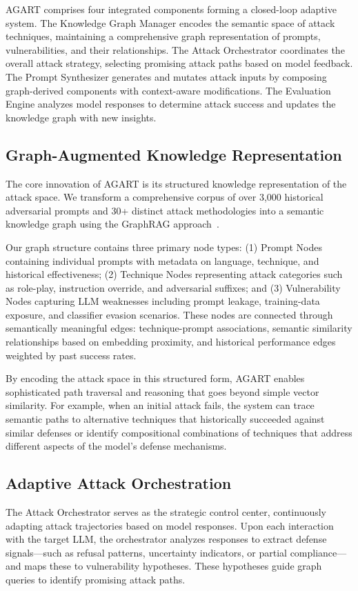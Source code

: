 AGART comprises four integrated components forming a closed-loop adaptive system. The Knowledge Graph Manager encodes the semantic space of attack techniques, maintaining a comprehensive graph representation of prompts, vulnerabilities, and their relationships. The Attack Orchestrator coordinates the overall attack strategy, selecting promising attack paths based on model feedback. The Prompt Synthesizer generates and mutates attack inputs by composing graph-derived components with context-aware modifications. The Evaluation Engine analyzes model responses to determine attack success and updates the knowledge graph with new insights.

\subsection{Graph-Augmented Knowledge Representation}
The core innovation of AGART is its structured knowledge representation of the attack space. We transform a comprehensive corpus of over 3,000 historical adversarial prompts and 30+ distinct attack methodologies into a semantic knowledge graph using the GraphRAG approach~\cite{GraphRAG}. 

Our graph structure contains three primary node types: (1) Prompt Nodes containing individual prompts with metadata on language, technique, and historical effectiveness; (2) Technique Nodes representing attack categories such as role-play, instruction override, and adversarial suffixes; and (3) Vulnerability Nodes capturing LLM weaknesses including prompt leakage, training-data exposure, and classifier evasion scenarios. These nodes are connected through semantically meaningful edges: technique-prompt associations, semantic similarity relationships based on embedding proximity, and historical performance edges weighted by past success rates.

By encoding the attack space in this structured form, AGART enables sophisticated path traversal and reasoning that goes beyond simple vector similarity. For example, when an initial attack fails, the system can trace semantic paths to alternative techniques that historically succeeded against similar defenses or identify compositional combinations of techniques that address different aspects of the model's defense mechanisms.

\subsection{Adaptive Attack Orchestration}
The Attack Orchestrator serves as the strategic control center, continuously adapting attack trajectories based on model responses. Upon each interaction with the target LLM, the orchestrator analyzes responses to extract defense signals—such as refusal patterns, uncertainty indicators, or partial compliance—and maps these to vulnerability hypotheses. These hypotheses guide graph queries to identify promising attack paths.

